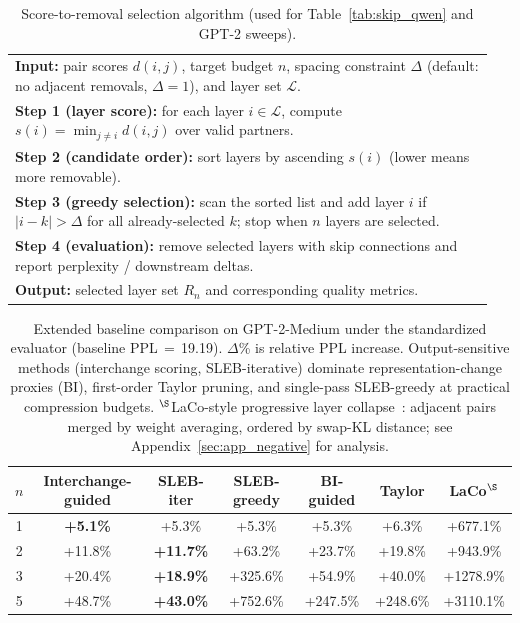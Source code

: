 \begin{table}[htbp]
\centering
\caption{Score-to-removal selection algorithm (used for Table~\ref{tab:skip_qwen} and GPT-2 sweeps).}
\label{tab:selection_algorithm}
\begin{tabular}{p{0.95\linewidth}}
\toprule
\textbf{Input:} pair scores $d(i,j)$, target budget $n$, spacing constraint $\Delta$ (default: no adjacent removals, $\Delta{=}1$), and layer set $\mathcal{L}$. \\
\textbf{Step 1 (layer score):} for each layer $i\in\mathcal{L}$, compute $s(i)=\min_{j\neq i} d(i,j)$ over valid partners. \\
\textbf{Step 2 (candidate order):} sort layers by ascending $s(i)$ (lower means more removable). \\
\textbf{Step 3 (greedy selection):} scan the sorted list and add layer $i$ if $|i-k|>\Delta$ for all already-selected $k$; stop when $n$ layers are selected. \\
\textbf{Step 4 (evaluation):} remove selected layers with skip connections and report perplexity / downstream deltas. \\
\textbf{Output:} selected layer set $R_n$ and corresponding quality metrics. \\
\bottomrule
\end{tabular}
\end{table}

\begin{table}[htbp]
\centering
\caption{Extended baseline comparison on GPT-2-Medium under the standardized evaluator (baseline PPL\,$=$\,19.19). $\Delta$\% is relative PPL increase. Output-sensitive methods (interchange scoring, SLEB-iterative) dominate representation-change proxies (BI), first-order Taylor pruning, and single-pass SLEB-greedy at practical compression budgets. $^\S$LaCo-style progressive layer collapse~\citep{yang2024laco}: adjacent pairs merged by weight averaging, ordered by swap-KL distance; see Appendix~\ref{sec:app_negative} for analysis.}
\label{tab:extended_baselines}
\begin{tabular}{ccccccc}
\toprule
$n$ & Interchange-guided & SLEB-iter & SLEB-greedy & BI-guided & Taylor & LaCo$^\S$ \\
\midrule
1 & \textbf{+5.1\%} & +5.3\% & +5.3\% & +5.3\% & +6.3\% & +677.1\% \\
2 & +11.8\% & \textbf{+11.7\%} & +63.2\% & +23.7\% & +19.8\% & +943.9\% \\
3 & +20.4\% & \textbf{+18.9\%} & +325.6\% & +54.9\% & +40.0\% & +1278.9\% \\
5 & +48.7\% & \textbf{+43.0\%} & +752.6\% & +247.5\% & +248.6\% & +3110.1\% \\
\bottomrule
\end{tabular}
\end{table}
